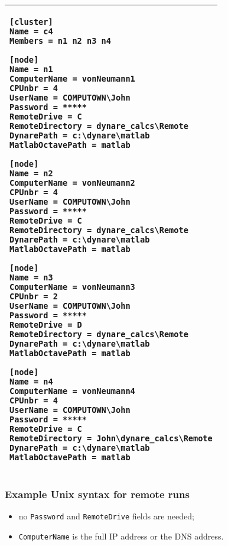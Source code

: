 \documentclass[12pt,a4paper,pdftex]{article}
\begin{document}
\begin{description}
\singlespacing
{\footnotesize
\hspace{2cm}\begin{tabular}[b]{| p{8cm} |}
  \hline
\begin{verbatim}
[cluster]
Name = c4
Members = n1 n2 n3 n4

[node]
Name = n1
ComputerName = vonNeumann1
CPUnbr = 4
UserName = COMPUTOWN\John
Password = *****
RemoteDrive = C
RemoteDirectory = dynare_calcs\Remote
DynarePath = c:\dynare\matlab
MatlabOctavePath = matlab

[node]
Name = n2
ComputerName = vonNeumann2
CPUnbr = 4
UserName = COMPUTOWN\John
Password = *****
RemoteDrive = C
RemoteDirectory = dynare_calcs\Remote
DynarePath = c:\dynare\matlab
MatlabOctavePath = matlab

[node]
Name = n3
ComputerName = vonNeumann3
CPUnbr = 2
UserName = COMPUTOWN\John
Password = *****
RemoteDrive = D
RemoteDirectory = dynare_calcs\Remote
DynarePath = c:\dynare\matlab
MatlabOctavePath = matlab

[node]
Name = n4
ComputerName = vonNeumann4
CPUnbr = 4
UserName = COMPUTOWN\John
Password = *****
RemoteDrive = C
RemoteDirectory = John\dynare_calcs\Remote
DynarePath = c:\dynare\matlab
MatlabOctavePath = matlab

\end{verbatim}
\\ \hline
\end{tabular}
}
\doublespacing
\end{description}



\subsubsection{Example Unix syntax for remote runs}
\begin{itemize}
\item no \verb"Password" and \verb"RemoteDrive" fields are needed;
\item \verb"ComputerName" is the full IP address or the DNS address.
\end{itemize}
\end{document}
